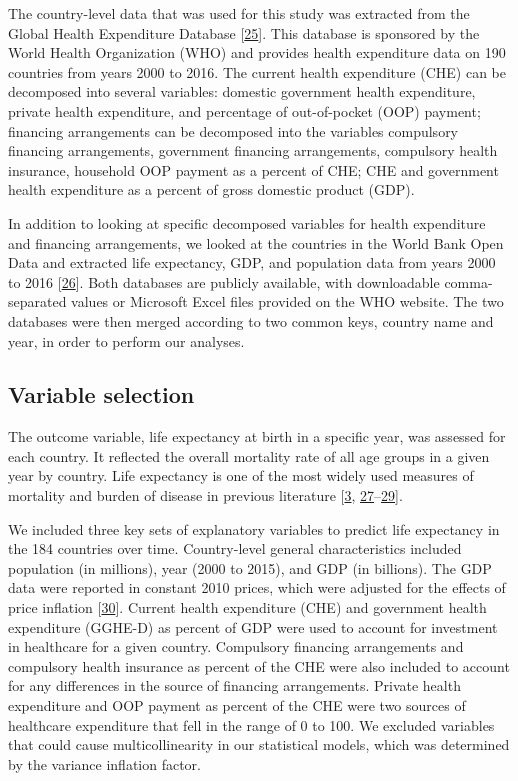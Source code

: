 \documentclass[]{elsarticle} %
\begin{document}
The country-level data that was used for this study was extracted from the Global Health Expenditure Database {[}\protect\hyperlink{ref-WHOdata}{25}{]}.
This database is sponsored by the World Health Organization (WHO) and provides health expenditure data on 190 countries from years 2000 to 2016.
The current health expenditure (CHE) can be decomposed into several variables: domestic government health expenditure, private health expenditure, and percentage of out-of-pocket (OOP) payment;
financing arrangements can be decomposed into the variables compulsory financing arrangements, government financing arrangements, compulsory health insurance, household OOP payment as a percent of CHE;
CHE and government health expenditure as a percent of gross domestic product (GDP).

In addition to looking at specific decomposed variables for health expenditure and financing arrangements, we looked at the countries in the World Bank Open Data and extracted life expectancy, GDP, and population data from years 2000 to 2016 {[}\protect\hyperlink{ref-worldbank}{26}{]}.
Both databases are publicly available, with downloadable comma-separated values or Microsoft Excel files provided on the WHO website.
The two databases were then merged according to two common keys, country name and year, in order to perform our analyses.

\hypertarget{variable-selection}{%
\subsection{Variable selection}\label{variable-selection}}

The outcome variable, life expectancy at birth in a specific year, was assessed for each country.
It reflected the overall mortality rate of all age groups in a given year by country.
Life expectancy is one of the most widely used measures of mortality and burden of disease in previous literature {[}\protect\hyperlink{ref-mathers2015causes}{3}, \protect\hyperlink{ref-lee2012effect}{27}--\protect\hyperlink{ref-bennett2015future}{29}{]}.

We included three key sets of explanatory variables to predict life expectancy in the 184 countries over time.
Country-level general characteristics included population (in millions), year (2000 to 2015), and GDP (in billions).
The GDP data were reported in constant 2010 prices, which were adjusted for the effects of price inflation {[}\protect\hyperlink{ref-worldbankconstant}{30}{]}.
Current health expenditure (CHE) and government health expenditure (GGHE-D) as percent of GDP were used to account for investment in healthcare for a given country.
Compulsory financing arrangements and compulsory health insurance as percent of the CHE were also included to account for any differences in the source of financing arrangements.
Private health expenditure and OOP payment as percent of the CHE were two sources of healthcare expenditure that fell in the range of 0 to 100. We excluded variables that could cause multicollinearity in our statistical models, which was determined by the variance inflation factor.
\end{document}
